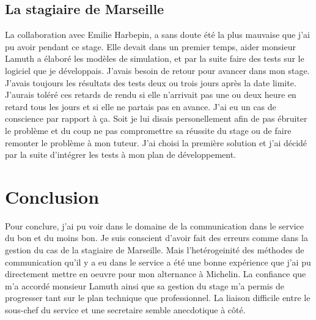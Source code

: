 \documentclass[a4paper,11pt]{article}
\begin{document}
\subsection{La stagiaire de Marseille}

\normalsize{
La collaboration avec Emilie Harbepin, a sans doute été la plus mauvaise que j'ai pu avoir pendant ce stage. Elle devait dans un premier temps, aider monsieur Lamuth a élaboré les modèles de simulation, et par la suite faire des tests sur le logiciel que je développais. J'avais besoin de retour pour avancer dans mon stage. J'avais toujours les résultats des tests deux ou trois jours après la date limite. J'aurais toléré ces retards de rendu si elle n'arrivait pas une ou deux heure en retard tous les jours et si elle ne partais pas en avance. J'ai eu un cas de conscience par rapport à ça. Soit je lui disais personellement afin de pas ébruiter le problème et du coup ne pas compromettre sa réussite du stage ou de faire remonter le problème à mon tuteur. J'ai choisi la première solution et j'ai décidé par la suite d'intégrer les tests à mon plan de développement. 
}

\newpage

\section{Conclusion}

\normalsize{
Pour conclure, j'ai pu voir dans le domaine de la communication dans le service du bon et du moins bon. Je suis conscient d'avoir fait des erreurs comme dans la gestion du cas de la stagiaire de Marseille. Mais l'hetérogeinité des méthodes de communication qu'il y a eu dans le service a été une bonne expérience que j'ai pu directement mettre en oeuvre pour mon alternance à Michelin. La confiance que m'a accordé monsieur Lamuth ainsi que sa gestion du stage m'a permis de progresser tant sur le plan technique que professionnel. La liaison difficile entre le sous-chef du service et une secretaire semble anecdotique à côté.
}
\end{document}
